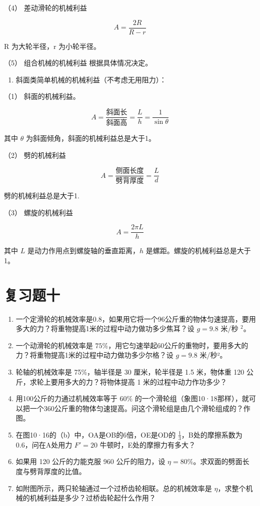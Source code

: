 （4） 差动滑轮的机械利益

\[
A = \frac {2 R}{R - r}
\]

R 为大轮半径，r 为小轮半径。

（5） 组合机械的机械利益 根据具体情况决定。

\begin{enumerate}
\def\labelenumi{\arabic{enumi}.}
\setcounter{enumi}{6}
\tightlist
\item
  斜面类简单机械的机械利益（不考虑无用阻力）：
\end{enumerate}

（1） 斜面的机械利益。

\[
A=\frac{\text{斜面长}}{\text{斜面高}} =\frac{L}{h} =\frac{1}{\sin\theta}
\]

其中 \(\theta\) 为斜面倾角，斜面的机械利益总是大于1。

（2） 劈的机械利益

\[
A=\frac{\text{侧面长度}}{\text{劈背厚度}}=\frac{L}{d}
\]

劈的机械利益总是大于1.

（3） 螺旋的机械利益

\[
A=\frac{2\pi L}{h}
\]

其中 \(L\) 是动力作用点到螺旋轴的垂直距离，\(h\)
是螺距。螺旋的机械利益总是大于1。

\section{复习题十}\label{ux590dux4e60ux9898ux5341}

\begin{enumerate}
\def\labelenumi{\arabic{enumi}.}
\item
  一个定滑轮的机械效率是0.8，如果用它将一个96公斤重的物体匀速提高，要用多大的力？将重物提高1米的过程中动力做功多少焦耳？设
  \(g=9.8\) 米/秒 \(^{2}\)。
\item
  一个动滑轮的机械效率是
  \(75\%\)，用它匀速举起60公斤的重物时，要用多大的力？将重物提高1米的过程中动力做功多少尔格？设
  \(g = 9.8\) 米/秒²。
\item
  轮轴的机械效率是 75\%，轴半径是 30 厘米，轮半径是 1.5 米，物体重 120
  公斤，求轮上要用多大的力？将物体提高 1 米的过程中动力作功多少？
\item
  用100公斤的力通过机械效率等于 \(60\%\)
  的一个滑轮组（象图10·18那样），就可以把一个360公斤重的物体匀速提高。问这个滑轮组是由几个滑轮组成的？作图。
\item
  在图10·16的（b）中，OA是OB的6倍，OE是OD的
  \(\frac{1}{3}\)，B处的摩擦系数为0.6，问在A处用力 \(F'=20\)
  牛顿时，E处的摩擦力有多大？
\item
  如果用 120 公斤的力能克服 960 公斤的阻力，设
  \(\eta = 80\%\)。求双面的劈面长度与劈背厚度的比值。
\item
  如附图所示，两只轮轴通过一个过桥齿轮相联。总的机械效率是
  \(\eta\)，求整个机械的机械利益是多少？过桥齿轮起什么作用？
\end{enumerate}

